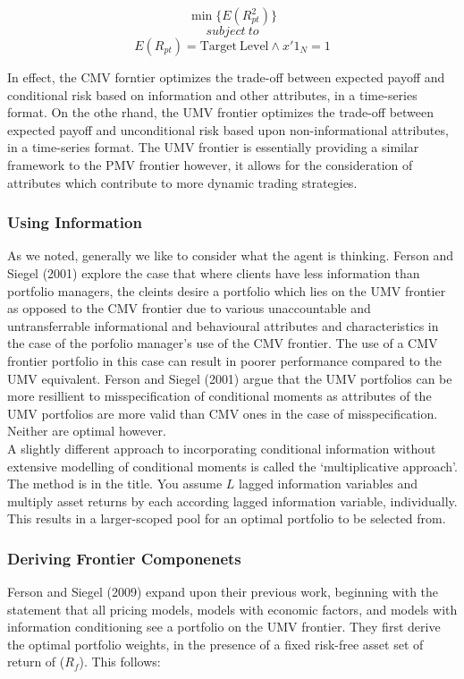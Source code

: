 \documentclass[11pt, english]{article}
\begin{document}
        $$\min\{E(R_{pt}^2)\}$$
        $$subject\ to$$
        $$E(R_{pt})=\mathrm{Target\ Level}\land x'1_N=1$$

        In effect, the CMV forntier optimizes the trade-off between expected payoff and conditional risk based on information and other attributes, in a time-series format. On the othe rhand, the UMV frontier optimizes the trade-off between expected payoff and unconditional risk based upon non-informational attributes, in a time-series format. The UMV frontier is essentially providing a similar framework to the PMV frontier however, it allows for the consideration of attributes which contribute to more dynamic trading strategies.

                \subsubsection*{Using Information}
        
        As we noted, generally we like to consider what the agent is thinking. Ferson and Siegel (2001) explore the case that where clients have less information than portfolio managers, the cleints desire a portfolio which lies on the UMV frontier as opposed to the CMV frontier due to various unaccountable and untransferrable informational and behavioural attributes and characteristics in the case of the porfolio manager's use of the CMV frontier. The use of a CMV frontier portfolio in this case can result in poorer performance compared to the UMV equivalent. Ferson and Siegel (2001) argue that the UMV portfolios can be more resillient to misspecification of conditional moments as attributes of the UMV portfolios are more valid than CMV ones in the case of misspecification. Neither are optimal however.\\

        A slightly different approach to incorporating conditional information without extensive modelling of conditional moments is called the `multiplicative approach'. The method is in the title. You assume $L$ lagged information variables and multiply asset returns by each according lagged information variable, individually. This results in a larger-scoped pool for an optimal portfolio to be selected from.

		\subsubsection*{Deriving Frontier Componenets}

        Ferson and Siegel (2009) expand upon their previous work, beginning with the statement that all pricing models, models with economic factors, and models with information conditioning see a portfolio on the UMV frontier. They first derive the optimal portfolio weights, in the presence of a fixed risk-free asset set of return of ($R_f$). This follows:
\end{document}

